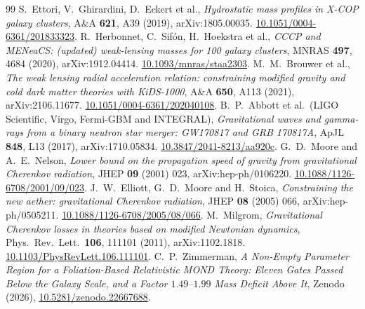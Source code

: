 \documentclass[11pt,letterpaper]{article}
\begin{document}
\begin{thebibliography}{99}
 S.\ Ettori, V.\ Ghirardini, D.\ Eckert et al., \emph{Hydrostatic mass profiles in X-COP galaxy clusters}, A\&A \textbf{621}, A39 (2019), arXiv:1805.00035. \href{https://doi.org/10.1051/0004-6361/201833323}{10.1051/0004-6361/201833323}.
 R.\ Herbonnet, C.\ Sif\'on, H.\ Hoekstra et al., \emph{CCCP and MENeaCS: (updated) weak-lensing masses for 100 galaxy clusters}, MNRAS \textbf{497}, 4684 (2020), arXiv:1912.04414. \href{https://doi.org/10.1093/mnras/staa2303}{10.1093/mnras/staa2303}.
 M.\ M.\ Brouwer et al., \emph{The weak lensing radial acceleration relation: constraining modified gravity and cold dark matter theories with KiDS-1000}, A\&A \textbf{650}, A113 (2021), arXiv:2106.11677. \href{https://doi.org/10.1051/0004-6361/202040108}{10.1051/0004-6361/202040108}.
 B.\ P.\ Abbott et al.\ (LIGO Scientific, Virgo, Fermi-GBM and INTEGRAL), \emph{Gravitational waves and gamma-rays from a binary neutron star merger: GW170817 and GRB 170817A}, ApJL \textbf{848}, L13 (2017), arXiv:1710.05834. \href{https://doi.org/10.3847/2041-8213/aa920c}{10.3847/2041-8213/aa920c}.
 G.\ D.\ Moore and A.\ E.\ Nelson, \emph{Lower bound on the propagation speed of gravity from gravitational Cherenkov radiation}, JHEP \textbf{09} (2001) 023, arXiv:hep-ph/0106220. \href{https://doi.org/10.1088/1126-6708/2001/09/023}{10.1088/1126-6708/2001/09/023}.
 J.\ W.\ Elliott, G.\ D.\ Moore and H.\ Stoica, \emph{Constraining the new aether: gravitational Cherenkov radiation}, JHEP \textbf{08} (2005) 066, arXiv:hep-ph/0505211. \href{https://doi.org/10.1088/1126-6708/2005/08/066}{10.1088/1126-6708/2005/08/066}.
 M.\ Milgrom, \emph{Gravitational Cherenkov losses in theories based on modified Newtonian dynamics}, Phys.\ Rev.\ Lett.\ \textbf{106}, 111101 (2011), arXiv:1102.1818. \href{https://doi.org/10.1103/PhysRevLett.106.111101}{10.1103/PhysRevLett.106.111101}.
 C.\ P.\ Zimmerman, \emph{A Non-Empty Parameter Region for a Foliation-Based Relativistic MOND Theory: Eleven Gates Passed Below the Galaxy Scale, and a Factor $1.49$--$1.99$ Mass Deficit Above It}, Zenodo (2026), \href{https://doi.org/10.5281/zenodo.22667688}{10.5281/zenodo.22667688}.
\end{thebibliography}
\end{document}
